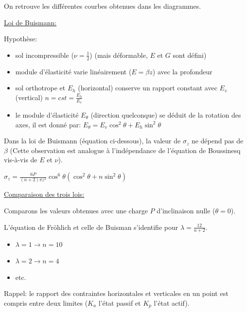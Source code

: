             On retrouve les différentes courbes obtenues dans les diagrammes.
            
            \underline{Loi de Buismann:} 
            
            Hypothèse:
            \begin{itemize}
                \item sol incompressible ($\nu = \frac{1}{2}$) (mais déformable, $E$ et $G$ sont défini)
                \item module d'élasticité varie linéairement ($E = \beta z$) avec la profondeur
                \item sol orthotrope et $E_h$ (horizontal) conserve un rapport constant avec $E_v$ (vertical) $n=cst=\frac{E_h}{E_v}$
                \item le module d'élasticité $E_{\theta}$ (direction quelconque) se déduit de la rotation des axes, il est donné par: $E_{\theta} = E_v \cos^2 \theta + E_h \sin^2 \theta$
            \end{itemize}
            
            Dans la loi de Buismann (équation ci-dessous), la valeur de $\sigma_z$ ne dépend pas de $\beta$ (Cette observation est analogue à l'indépendance de l'équation de Boussinesq vis-à-vis de $E$ et $\nu$).
            
            \begin{center}
                $\sigma_z = \frac{6P}{(n+2) \pi z^2} \cos^6 \theta (\cos^2 \theta + n \sin^2 \theta)$
            \end{center} 
            
            \underline{Comparaison des trois lois:} 
            
            Comparons les valeurs obtenues avec une charge $P$ d'inclinaison nulle ($\theta = 0$).
            
            L'équation de Fröhlich et celle de Buisman s'identifie pour $\lambda = \frac{12}{n+2}$.
            
            \begin{itemize}
                \item $\lambda = 1 \to n=10 $
                \item $\lambda = 2 \to n=4 $
                \item etc.
            \end{itemize} 
            
            Rappel: le rapport des contraintes horizontales et verticales en un point est compris entre deux limites ($K_a$ l'état passif et $K_p$ l'état actif). 
            
